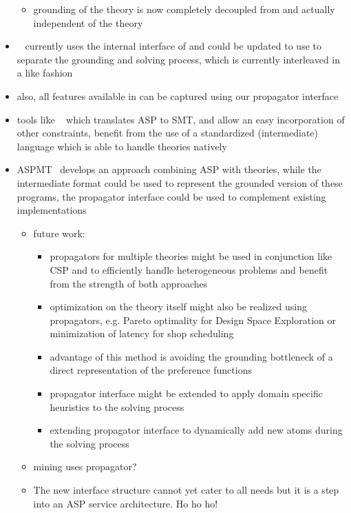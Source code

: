 \begin{itemize}
\begin{itemize}
	\item grounding of the theory is now completely decoupled from \clingcon{} and actually independent of the theory
	\end{itemize}
\item {}~\cite{drewal12a} currently uses the internal interface of \clasp{} and could be updated to
use \aspif{} to separate the grounding and solving process,
which is currently interleaved in a \clingo{} like fashion
\item also, all features available in  can be captured using our propagator interface
\item tools like ~\cite{jalini11a} which translates ASP to SMT,
and allow an easy incorporation of other constraints,
benefit from the use of a standardized (intermediate) language which is able to handle theories natively
\item ASPMT~\cite{barlee14b} develops an approach combining ASP with theories,
while the intermediate format could be used to represent the grounded version of these programs,
the propagator interface could be used to complement existing implementations
\begin{itemize}
  \item future work:
  \begin{itemize}
   \item propagators for multiple theories might be used in conjunction like CSP and \DL{} to efficiently handle heterogeneous problems and benefit from the strength of both approaches
   \item optimization on the theory itself might also be realized using propagators, e.g. Pareto optimality for Design Space Exploration or minimization of latency for shop scheduling
   \item advantage of this method is avoiding the grounding bottleneck of a direct representation of the preference functions
   \item propagator interface might be extended to apply domain specific heuristics to the solving process
   \item extending propagator interface to dynamically add new atoms during the solving process
  \end{itemize}
  \item mining uses propagator? 
\item 
The new interface structure cannot yet cater to all needs but it is a step into an ASP service architecture. Ho ho ho!
\end{itemize}

\end{itemize}

